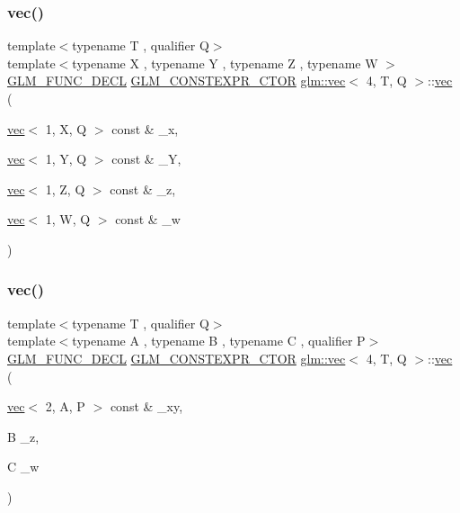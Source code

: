 \subsubsection{\texorpdfstring{vec()}{vec()}\hspace{0.1cm}{\footnotesize\ttfamily [7/34]}}
{\footnotesize\ttfamily template$<$typename T , qualifier Q$>$ \\
template$<$typename X , typename Y , typename Z , typename W $>$ \\
\mbox{\hyperlink{setup_8hpp_ab2d052de21a70539923e9bcbf6e83a51}{G\+L\+M\+\_\+\+F\+U\+N\+C\+\_\+\+D\+E\+CL}} \mbox{\hyperlink{setup_8hpp_ad34178a09666081abdb573c14d1f4a5a}{G\+L\+M\+\_\+\+C\+O\+N\+S\+T\+E\+X\+P\+R\+\_\+\+C\+T\+OR}} \mbox{\hyperlink{structglm_1_1vec}{glm\+::vec}}$<$ 4, T, Q $>$\+::\mbox{\hyperlink{structglm_1_1vec}{vec}} (\begin{DoxyParamCaption}\item[{\mbox{\hyperlink{structglm_1_1vec}{vec}}$<$ 1, X, Q $>$ const \&}]{\+\_\+x,  }\item[{\mbox{\hyperlink{structglm_1_1vec}{vec}}$<$ 1, Y, Q $>$ const \&}]{\+\_\+Y,  }\item[{\mbox{\hyperlink{structglm_1_1vec}{vec}}$<$ 1, Z, Q $>$ const \&}]{\+\_\+z,  }\item[{\mbox{\hyperlink{structglm_1_1vec}{vec}}$<$ 1, W, Q $>$ const \&}]{\+\_\+w }\end{DoxyParamCaption})}

\mbox{\label{structglm_1_1vec_3_014_00_01_t_00_01_q_01_4_a973c9293d62029453e5e2619061f84e8}} 
\subsubsection{\texorpdfstring{vec()}{vec()}\hspace{0.1cm}{\footnotesize\ttfamily [8/34]}}
{\footnotesize\ttfamily template$<$typename T , qualifier Q$>$ \\
template$<$typename A , typename B , typename C , qualifier P$>$ \\
\mbox{\hyperlink{setup_8hpp_ab2d052de21a70539923e9bcbf6e83a51}{G\+L\+M\+\_\+\+F\+U\+N\+C\+\_\+\+D\+E\+CL}} \mbox{\hyperlink{setup_8hpp_ad34178a09666081abdb573c14d1f4a5a}{G\+L\+M\+\_\+\+C\+O\+N\+S\+T\+E\+X\+P\+R\+\_\+\+C\+T\+OR}} \mbox{\hyperlink{structglm_1_1vec}{glm\+::vec}}$<$ 4, T, Q $>$\+::\mbox{\hyperlink{structglm_1_1vec}{vec}} (\begin{DoxyParamCaption}\item[{\mbox{\hyperlink{structglm_1_1vec}{vec}}$<$ 2, A, P $>$ const \&}]{\+\_\+xy,  }\item[{B}]{\+\_\+z,  }\item[{C}]{\+\_\+w }\end{DoxyParamCaption})}



